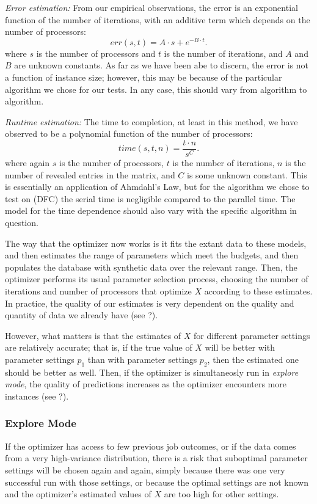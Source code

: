 {\em Error estimation:} From our empirical observations, the error is an exponential function of
the number of iterations, with an additive term which depends on the number
of processors:
\[
err(s,t) = A\cdot s + e^{-B\cdot t}.
\]
where $s$ is the number of processors and $t$ is the number of iterations, 
and $A$ and $B$ are unknown constants. As far as we have been abe to 
discern, the error is not a function of instance size; however, this
may be because of the particular algorithm we chose for our tests. In 
any case, this should vary from algorithm to algorithm.

{\em Runtime estimation:} The time to completion, at least 
in this method, we have observed to be a polynomial function of the 
number of processors:
\[
time(s,t,n) = \frac{t\cdot n}{s^{C}}. %
\]
where again $s$ is the number of processors, $t$ is the number of 
iterations, $n$ is the number of revealed entries in the matrix, 
and $C$ is some unknown constant. This is essentially an application of 
Ahmdahl's Law, but for the algorithm we chose to test on (DFC) the
serial time is negligible compared to the parallel time. The model
for the time dependence should also vary with the specific algorithm
in question. 

The way that the optimizer now works is it fits the extant data to
these models, and then estimates the range of parameters which meet the
budgets, and then populates the database with synthetic data 
over the relevant range. Then, the optimizer performs its usual
parameter selection process, choosing the  number of iterations 
and number of processors that optimize $X$ according to these estimates. 
In practice, the quality of our estimates is very dependent on the 
quality and quantity of data we already have 
(see ?). %

However, what matters is that the estimates of $X$ for different 
parameter settings are relatively accurate; that is, if the true value 
of $X$ will be better with parameter settings $p_1$ than with parameter
settings $p_2$, then the estimated one should be better as well. Then, 
if the optimizer is simultaneosly run in {\em explore mode}, the quality
of predictions increases as the optimizer encounters more 
instances (see ?). %

\subsubsection{Explore Mode}
\label{sec:explore}
If the optimizer has access to few previous job outcomes, or if the data
comes from a very high-variance distribution, there is a risk that 
suboptimal parameter settings will be chosen again and again, simply 
because there was one very successful run with those settings, or because
the optimal settings are not known and the optimizer's estimated values
of $X$ are too high for other settings.

